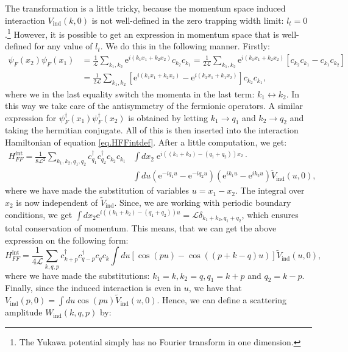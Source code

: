The transformation is a little tricky, because the momentum space induced interaction $V_{\text{ind}}(k, 0)$ is not well-defined in the zero trapping width limit: $l_t = 0$.\footnote{The Yukawa potential simply has no Fourier transform in one dimension.} However, it is possible to get an expression in momentum space that is well-defined for any value of $l_t$. We do this in the following manner. Firstly:
\begin{align}
\psi_F(x_2) \psi_F(x_1) &= \frac{1}{\mathcal{L}}\sum_{k_1,k_2} \text{e}^{i(k_1x_1 + k_2x_2)} c_{k_2}c_{k_1} = \frac{1}{2\mathcal{L}}\sum_{k_1,k_2} \text{e}^{i(k_1x_1 + k_2x_2)} \left[c_{k_2}c_{k_1} - c_{k_1}c_{k_2}\right] \nonumber \\
&= \frac{1}{2\mathcal{L}}\sum_{k_1,k_2} \left[\text{e}^{i(k_1x_1 + k_2x_2)} - \text{e}^{i(k_2x_1 + k_1x_2)}\right]c_{k_2}c_{k_1}, \nonumber
\end{align}
where we in the last equality switch the momenta in the last term: $k_1 \leftrightarrow k_2$. In this way we take care of the antisymmetry of the fermionic operators. A similar expression for $\psi^\dagger_F(x_1)\psi^\dagger_F(x_2)$ is obtained by letting $k_1 \to q_1$ and $k_2 \to q_2$ and taking the hermitian conjugate. All of this is then inserted into the interaction Hamiltonian of equation \eqref{eq.HFFintdef}. After a little computation, we get:
\begin{align}
H^\text{int}_{FF} = \frac{1}{8\mathcal{L}^2} \sum_{k_1,k_2,q_1,q_2} c^\dagger_{q_1}c^\dagger_{q_2}c_{k_2}c_{k_1} & \int dx_2 \; \text{e}^{i((k_1+k_2)-(q_1+q_2))x_2}\cdot \nonumber \\ 
&\int du\left(\text{e}^{-iq_1u} - \text{e}^{-iq_2u}\right)\left(\text{e}^{ik_1u} - \text{e}^{ik_2u}\right)\tilde{V}_\text{ind}(u,0), \nonumber
\end{align}
where we have made the substitution of variables $u = x_1 - x_2$. The integral over $x_2$ is now independent of $\tilde{V}_{\text{ind}}$. Since, we are working with periodic boundary conditions, we get $\int dx_2 \text{e}^{i((k_1+k_2)-(q_1+q_2))u} = \mathcal{L}\delta_{k_1+k_2,q_1+q_2}$, which ensures total conservation of momentum. This means, that we can get the above expression on the following form: 
\begin{equation}
H^\text{int}_{FF} = \frac{1}{4\mathcal{L}} \sum_{k,q,p} c^\dagger_{k+p}c^\dagger_{q-p}c_{q}c_{k} \int du\left[\cos\left(pu\right) - \cos\left(\left( p + k - q \right)u\right)\right]\tilde{V}_{\text{ind}}(u,0), \nonumber
\end{equation}
where we have made the substitutions: $k_1 = k, k_2 = q, q_1 = k + p$ and $q_2 = k - p$. Finally, since the induced interaction is even in $u$, we have that $V_{\text{ind}}(p, 0) = \int du \cos(pu) \tilde{V}_{\text{ind}}(u, 0)$. Hence, we can define a scattering amplitude $W_{\text{ind}}(k, q, p)$ by:
